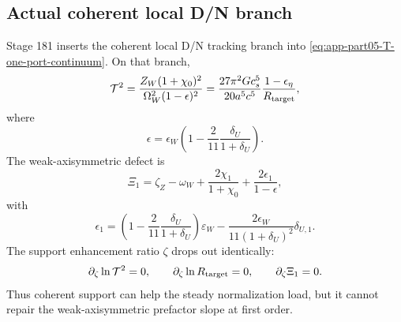 \subsection{Actual coherent local D/N branch}
Stage 181 inserts the coherent local D/N tracking branch into \eqref{eq:app-part05-T-one-port-continuum}.  On that branch,
\begin{equation}
\label{eq:app-part05-coherent-T}
\mathcal T^2
=
\frac{Z_W(1+\chi_0)^2}{\Omega_W^2(1-\epsilon)^2}
=
\frac{27\pi^2Gc_s^5}{20a^5c^5}\frac{1-\epsilon_\eta}{R_{\rm target}},
\end{equation}
where
\begin{equation}
\label{eq:app-part05-epsilon-split}
\epsilon
=
\epsilon_W\left(1-\frac{2}{11}\frac{\delta_U}{1+\delta_U}\right).
\end{equation}
The weak-axisymmetric defect is
\begin{equation}
\label{eq:app-part05-Xi1-coherent-physical}
\Xi_1
=
\zeta_Z-\omega_W
+
\frac{2\chi_1}{1+\chi_0}
+
\frac{2\epsilon_1}{1-\epsilon},
\end{equation}
with
\begin{equation}
\label{eq:app-part05-epsilon1-coherent}
\epsilon_1
=
\left(1-\frac{2}{11}\frac{\delta_U}{1+\delta_U}\right)\varepsilon_W
-
\frac{2\epsilon_W}{11(1+\delta_U)^2}\delta_{U,1}.
\end{equation}
The support enhancement ratio \(\zeta\) drops out identically:
\begin{equation}
\label{eq:app-part05-support-blindness}
\partial_\zeta\ln\mathcal T^2=0,
\qquad
\partial_\zeta\ln R_{\rm target}=0,
\qquad
\partial_\zeta\Xi_1=0.
\end{equation}
Thus coherent support can help the steady normalization load, but it cannot repair the weak-axisymmetric prefactor slope at first order.

